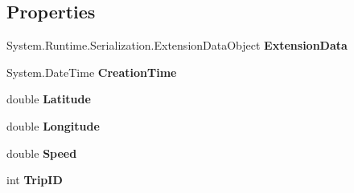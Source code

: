 \subsection*{Properties}
\begin{DoxyCompactItemize}
\item 
\hypertarget{class_tripi_w_c_f_1_1_client_mockup_1_1_proxy_1_1_position_node_a6387fb9f3cb15addfd974a6bf18dc151}{
System.Runtime.Serialization.ExtensionDataObject {\bfseries ExtensionData}}
\label{class_tripi_w_c_f_1_1_client_mockup_1_1_proxy_1_1_position_node_a6387fb9f3cb15addfd974a6bf18dc151}

\item 
\hypertarget{class_tripi_w_c_f_1_1_client_mockup_1_1_proxy_1_1_position_node_a25e70b5ac7e1562bee46c550b655aca3}{
System.DateTime {\bfseries CreationTime}}
\label{class_tripi_w_c_f_1_1_client_mockup_1_1_proxy_1_1_position_node_a25e70b5ac7e1562bee46c550b655aca3}

\item 
\hypertarget{class_tripi_w_c_f_1_1_client_mockup_1_1_proxy_1_1_position_node_a9ba611f655423cc8bc154842217cf51f}{
double {\bfseries Latitude}}
\label{class_tripi_w_c_f_1_1_client_mockup_1_1_proxy_1_1_position_node_a9ba611f655423cc8bc154842217cf51f}

\item 
\hypertarget{class_tripi_w_c_f_1_1_client_mockup_1_1_proxy_1_1_position_node_adbdb2873251e38496507f5ff1fdd02ef}{
double {\bfseries Longitude}}
\label{class_tripi_w_c_f_1_1_client_mockup_1_1_proxy_1_1_position_node_adbdb2873251e38496507f5ff1fdd02ef}

\item 
\hypertarget{class_tripi_w_c_f_1_1_client_mockup_1_1_proxy_1_1_position_node_aca550e2dfc8a18a7af3e96dd0c1658e8}{
double {\bfseries Speed}}
\label{class_tripi_w_c_f_1_1_client_mockup_1_1_proxy_1_1_position_node_aca550e2dfc8a18a7af3e96dd0c1658e8}

\item 
\hypertarget{class_tripi_w_c_f_1_1_client_mockup_1_1_proxy_1_1_position_node_ae9f32fe5838c27dfa2facb0cf250af28}{
int {\bfseries TripID}}
\label{class_tripi_w_c_f_1_1_client_mockup_1_1_proxy_1_1_position_node_ae9f32fe5838c27dfa2facb0cf250af28}


\end{DoxyCompactItemize}
